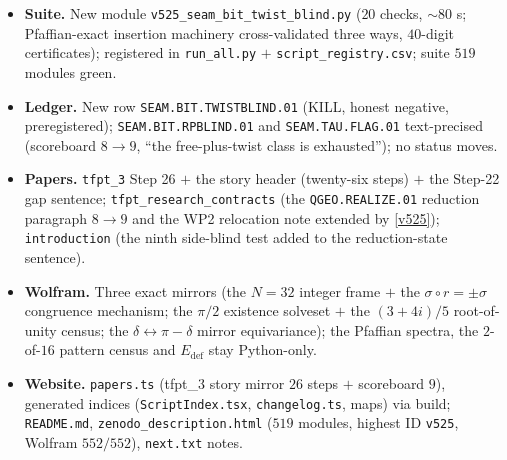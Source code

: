 \begin{itemize}[leftmargin=1.5em]
\item \textbf{Suite.} New module \texttt{v525\_seam\_bit\_twist\_blind.py} ($20$ checks, $\sim80$ s;
Pfaffian-exact insertion machinery cross-validated three ways, $40$-digit certificates);
registered in \texttt{run\_all.py} $+$ \texttt{script\_registry.csv}; suite $519$ modules green.
\item \textbf{Ledger.} New row \texttt{SEAM.BIT.TWISTBLIND.01} (KILL, honest negative,
preregistered); \texttt{SEAM.BIT.RPBLIND.01} and \texttt{SEAM.TAU.FLAG.01} text-precised
(scoreboard $8\to9$, ``the free-plus-twist class is exhausted''); no status moves.
\item \textbf{Papers.} \texttt{tfpt\_3} Step 26 $+$ the story header (twenty-six steps) $+$ the
Step-22 gap sentence; \texttt{tfpt\_research\_contracts} (the \texttt{QGEO.REALIZE.01}
reduction paragraph $8\to9$ and the WP2 relocation note extended by \vref{v525});
\texttt{introduction} (the ninth side-blind test added to the reduction-state sentence).
\item \textbf{Wolfram.} Three exact mirrors (the $N=32$ integer frame $+$ the
$\sigma\circ r=\pm\sigma$ congruence mechanism; the $\pi/2$ existence solveset $+$ the
$(3+4i)/5$ root-of-unity census; the $\delta\leftrightarrow\pi-\delta$ mirror equivariance);
the Pfaffian spectra, the $2$-of-$16$ pattern census and $E_{\mathrm{def}}$ stay Python-only.
\item \textbf{Website.} \texttt{papers.ts} (tfpt\_3 story mirror $26$ steps $+$ scoreboard $9$),
generated indices (\texttt{ScriptIndex.tsx}, \texttt{changelog.ts}, maps) via build;
\texttt{README.md}, \texttt{zenodo\_description.html} ($519$ modules, highest ID
\texttt{v525}, Wolfram $552/552$), \texttt{next.txt} notes.
\end{itemize}

